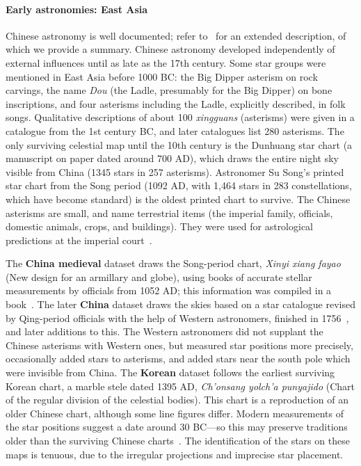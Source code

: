 \documentclass[10pt]{article}
\begin{document}
\paragraph{Early astronomies: East Asia} Chinese astronomy is well documented; refer to~\cite{stephenson1994chinese,stephenson2013EAmaps} for an extended description, of which we provide a summary. Chinese astronomy developed independently of external influences until as late as the 17th century. Some star groups were mentioned in East Asia before 1000 BC: the Big Dipper asterism on rock carvings, the name \emph{Dou} (the Ladle, presumably for the Big Dipper) on bone inscriptions, and four asterisms including the Ladle, explicitly described, in folk songs. Qualitative descriptions of about 100 \emph{xingguans} (asterisms) were given in a catalogue from the 1st century BC, and later catalogues list 280 asterisms. The only surviving celestial map until the 10th century is the Dunhuang star chart (a manuscript on paper dated around 700 AD), which draws the entire night sky visible from China (1345 stars in 257 asterisms). Astronomer Su Song's printed star chart from the Song period (1092 AD, with 1,464 stars in 283 constellations, which have become standard) is the oldest printed chart to survive. The Chinese asterisms are small, and name terrestrial items (the imperial family, officials, domestic animals, crops, and buildings). They were used for astrological predictions at the imperial court~\cite{stephenson1994chinese}.

The {\bf China medieval} dataset draws the Song-period chart, \emph{Xinyi xiang fayao} (New design for an armillary and globe), using books of accurate stellar measurements by officials from 1052 AD; this information was compiled in a book~\cite{pan1989history}. The later {\bf China} dataset draws the skies based on a star catalogue revised by Qing-period officials with the help of Western astronomers, finished in 1756~\cite{pan1989history}, and later additions to this. The Western astronomers did not supplant the Chinese asterisms with Western ones, but measured star positions more precisely, occasionally added stars to asterisms, and added stars near the south pole which were invisible from China. The {\bf Korean} dataset follows the earliest surviving Korean chart, a marble stele dated 1395 AD, \emph{Ch’onsang yolch’a punyajido} (Chart of the regular division of the celestial bodies). This chart is a reproduction of an older Chinese chart, although some line figures differ. Modern measurements of the star positions suggest a date around 30 BC---so this may preserve traditions older than the surviving Chinese charts~\cite{stephenson2013EAmaps}. The identification of the stars on these maps is tenuous, due to the irregular projections and imprecise star placement.
\end{document}
